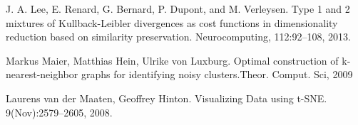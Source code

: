 \documentclass{EPL-master-thesis-covers-EN}
\begin{document}
\begin{thebibliography}{99}
J. A. Lee, E. Renard, G. Bernard, P. Dupont, and M. Verleysen. Type 1 and 2 mixtures of Kullback-Leibler divergences as cost functions in dimensionality reduction based on similarity preservation. Neurocomputing, 112:92–108, 2013.

Markus Maier, Matthias Hein, Ulrike von Luxburg. Optimal construction of k-nearest-neighbor graphs for identifying noisy clusters.Theor. Comput. Sci, 2009

Laurens van der Maaten, Geoffrey Hinton. Visualizing Data using t-SNE. 9(Nov):2579--2605, 2008.

\end{thebibliography}

  \backcoverpage
\end{document}
